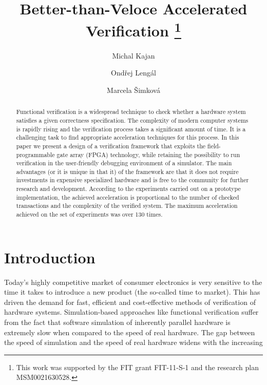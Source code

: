 \documentclass[draft]{llncs}
\title{Better-than-Veloce Accelerated Verification
\thanks{This work was supported by the FIT grant FIT-11-S-1 and the research plan 
MSM0021630528.}\vspace*{-0mm}}
\author{Michal Kajan%
\and  Ond\v{r}ej Leng\'{a}l%
\and  Marcela \v{S}imkov\'{a}%
}
\institute{ {FIT, Brno University of Technology, Czech Republic}
}
\begin{document}
 

\maketitle

\vspace*{-0mm}\begin{abstract}Functional verification is a widespread technique 
to check whether a hardware system satisfies a given correctness specification. 
The complexity of modern computer systems is rapidly rising and the 
verification process takes a significant amount of time. It is a challenging 
task to find appropriate acceleration techniques for this process. In this 
paper we present a design of a verification framework that exploits the 
field-programmable gate array (FPGA) technology, while retaining the 
possibility to run verification in the user-friendly debugging environment of a 
simulator. The main advantages (or it is unique in that it) of the framework 
are that it does not require investments in expensive specialized hardware and 
is free to the community for further research and development. According to the 
experiments carried out on a prototype implementation, the achieved 
acceleration is proportional to the number of checked transactions and the 
complexity of the verified system. The maximum acceleration achieved on the set 
of experiments was over 130 times.\end{abstract}
\vspace*{-0mm}\section{Introduction}\vspace*{-0mm}
Today's highly competitive market of consumer electronics is very sensitive to the 
time it takes to introduce a new product (the so-called time to market). This has 
driven the demand for fast, efficient and cost-effective methods of verification 
of hardware systems. Simulation-based approaches like functional verification 
suffer from the fact that software simulation of inherently parallel hardware is 
extremely slow when compared to the speed of real hardware. The gap between the 
speed of simulation and the speed of real hardware widens with the increasing 
\end{document}
